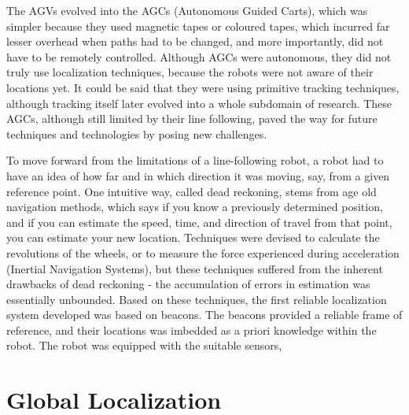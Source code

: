 The AGVs evolved into the AGCs (Autonomous Guided Carts), which was simpler because they used magnetic tapes or coloured tapes, which incurred
far lesser overhead when paths had to be changed, and more importantly, did not have to be remotely controlled. Although AGCs were autonomous,
they did not truly use localization techniques, because the robots were not aware of their locations yet. It could be said that they were using 
primitive tracking techniques, although tracking itself later evolved into a whole subdomain of research. These AGCs, although still
limited by their line following, paved the way for future techniques and technologies by posing new challenges.

To move forward from the limitations of a line-following robot, a robot had to have an idea of how far and in which direction it was moving, 
say, from a given reference point. One intuitive way, called dead reckoning, stems from age old navigation methods, which says if you know
a previously determined position, and if you can estimate the speed, time, and direction of travel from that point, you can estimate your new
location. Techniques were devised to calculate the revolutions of the wheels, or to measure the force experienced during acceleration
(Inertial Navigation Systems), but these techniques suffered from the inherent drawbacks of dead reckoning - the accumulation of errors in
estimation was essentially unbounded. Based on these techniques, the first reliable localization system developed was based on beacons.
The beacons provided a reliable frame of reference, and their locations was imbedded as a priori knowledge within the robot. The robot was 
equipped with the suitable sensors, 




\section{Global Localization}
\label{sec:robo-global}
